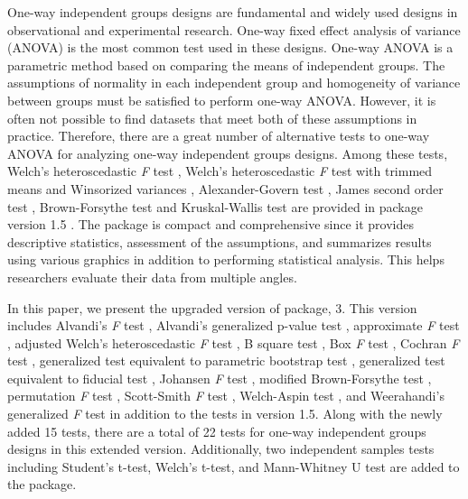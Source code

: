 One-way independent groups designs are fundamental and widely used designs in observational and experimental research. One-way fixed effect analysis of variance (ANOVA) is the most common test used in these designs. One-way ANOVA is a parametric method based on comparing the means of independent groups. The assumptions of normality in each independent group and homogeneity of variance between groups must be satisfied to perform one-way ANOVA. However, it is often not possible to find datasets that meet both of these assumptions in practice. Therefore, there are a great number of alternative tests to one-way ANOVA for analyzing one-way independent groups designs. Among these tests, Welch’s heteroscedastic \textit{F} test \citep{WELCH:1951}, Welch’s heteroscedastic \textit{F} test with trimmed means and Winsorized variances \citep{WELCH:1951}, Alexander-Govern test \citep{alexander1994}, James second order test \citep{JAMES:1951}, Brown-Forsythe test \citep{brown1974a, brown1974b} and Kruskal-Wallis test \citep{kruskal1952} are provided in  package version 1.5 \citep{Dag2017onewaytests}. The  package is compact and comprehensive since it provides descriptive statistics, assessment of the assumptions, and summarizes results using various graphics in addition to performing statistical analysis. This helps researchers evaluate their data from multiple angles. 

In this paper, we present the upgraded version of  package,  3. This version includes Alvandi's \textit{F} test \citep{sadooghi2012}, Alvandi's generalized p-value test \citep{sadooghi2012}, approximate \textit{F} test \citep{asiribo1990coping}, adjusted Welch's heteroscedastic \textit{F} test \citep{WELCH:1951}, B square test \citep{ozdemir2006one}, Box \textit{F} test \citep{box1954some}, Cochran \textit{F} test \citep{cochran1937}, generalized test equivalent to parametric bootstrap test \citep{weerahandi2019}, generalized test equivalent to fiducial test \citep{weerahandi2019}, Johansen \textit{F} test \citep{johansen1980welch}, modified Brown-Forsythe test \citep{mehrotra1997improving}, permutation \textit{F} test \citep{berry2002fisher}, Scott-Smith \textit{F} test \citep{scott1971interval}, Welch-Aspin test \citep{aspin1948}, and Weerahandi's generalized \textit{F} test \citep{weerahandi1995} in addition to the tests in version 1.5. Along with the newly added 15 tests, there are a total of 22 tests for one-way independent groups designs in this extended version. Additionally, two independent samples tests including Student’s t-test, Welch’s t-test, and Mann-Whitney U test are added to the package.

